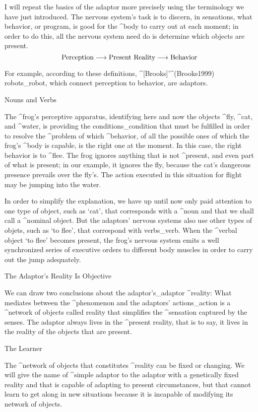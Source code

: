 I will repeat the basics of the adaptor more precisely using the
terminology we have just introduced. The nervous system's task is to
discern, in sensations, what behavior, or program, is good for the
^{body} to carry out at each moment; in order to do this, all the
nervous system need do is determine which objects are present.
$$\hbox{Perception} \longrightarrow \hbox{Present Reality}
   \longrightarrow \hbox{Behavior}$$

For example, according to these definitions, ^[Brooks]'^(Brooks1999)
robots_{robot}, which connect perception to behavior, are adaptors.


\Section Nouns and Verbs

The ^{frog}'s perceptive apparatus, identifying here and now the objects
^{fly}, ^{cat}, and ^{water}, is providing the conditions_{condition}
that must be fulfilled in order to resolve the ^{problem} of which
^{behavior}, of all the possible ones of which the frog's ^{body} is
capable, is the right one at the moment. In this case, the right
behavior is to ^{flee}. The frog ignores anything that is not
^{present}, and even part of what is present; in our example, it ignores
the fly, because the cat's dangerous presence prevails over the fly's.
The action executed in this situation for flight may be jumping into the
water.

In order to simplify the explanation, we have up until now only paid
attention to one type of object, such as `cat', that corresponds with a
^{noun} and that we shall call a ^{nominal object}. But the adaptors'
nervous systems also use other types of objets, such as `to flee', that
correspond with verbs_{verb}. When the ^{verbal object} `to flee'
becomes present, the frog's nervous system emits a well synchronized
series of executive orders to different body muscles in order to carry
out the jump adequately.


\Section The Adaptor's Reality Is Objective

We can draw two conclusions about the adaptor's_{adaptor} ^{reality}:
\point What mediates between the ^{phenomenon} and the adaptors'
actions_{action} is a ^{network of objects} called reality that
simplifies the ^{sensation} captured by the senses.
\point The adaptor always lives in the ^{present} reality, that is to
say, it lives in the reality of the objects that are present.


\Section The Learner

The ^{network of objects} that constitutes ^{reality} can be fixed or
changing. We will give the name of ^{simple adaptor} to the adaptor with
a genetically fixed reality and that is capable of adapting to present
circumstances, but that cannot learn to get along in new situations
because it is incapable of modifying its network of objects.

